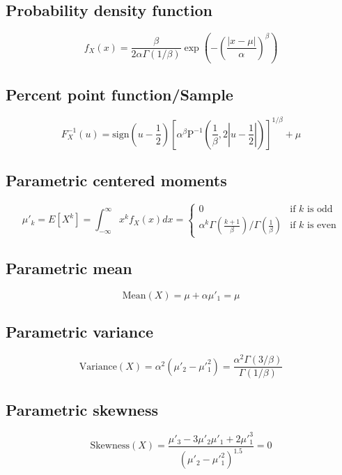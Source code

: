 \documentclass{article}
\begin{document}
\subsection{Probability density function}
\begin{equation*} f_{X}\left(x\right)=\frac{\beta}{2\alpha\Gamma(1/\beta)}\exp\left(-\left(\frac{|x-\mu|}{\alpha}\right)^\beta\right) \end{equation*}
\subsection{Percent point function/Sample}
\begin{equation*} F^{-1}_{X}\left(u\right)=\text{sign}(u-\frac{1}{2}) \left[\alpha^\beta \text{P}^{-1}\left(\frac{1}{\beta},2|u-\frac{1}{2}|\right)\right]^{1/\beta}+\mu \end{equation*}
\subsection{Parametric centered moments}
\begin{equation*} \mu'_{k}=E[X^k]=\int_{-\infty}^{\infty}x^{k}f_{X}\left(x\right)dx=\left\{\begin{array}{cl}0 & \text{if }k\text{ is odd} \\ \alpha^{k} \Gamma\left(\frac{k+1}{\beta}\right) \Big/ \Gamma\left(\frac{1}{\beta}\right) & \text{if }k\text{ is even}\end{array} \right. \end{equation*}
\subsection{Parametric mean}
\begin{equation*} \mathrm{Mean}(X)=\mu+\alpha\mu'_{1}=\mu \end{equation*}
\subsection{Parametric variance}
\begin{equation*} \mathrm{Variance}(X)=\alpha^2(\mu'_{2}-\mu'^{2}_{1})=\frac{\alpha^2\Gamma(3/\beta)}{\Gamma(1/\beta)} \end{equation*}
\subsection{Parametric skewness}
\begin{equation*} \mathrm{Skewness}(X)=\frac{\mu'_{3}-3\mu'_{2}\mu'_{1}+2\mu'^{3}_{1}}{(\mu'_{2}-\mu'^{2}_{1})^{1.5}}=0 \end{equation*}
\end{document}
